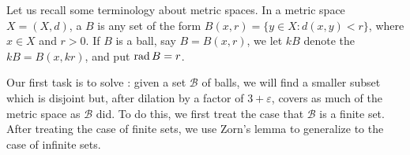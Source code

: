 \begin{subsec}
Let us recall some terminology about metric spaces.
In a metric space $X = (X, d)$, a  $B$ is any set of the form $B(x, r) = \{y \in X: d(x, y) < r\}$, where $x \in X$ and $r > 0$.
If $B$ is a ball, say $B = B(x, r)$, we let $kB$ denote the  $kB = B(x, kr)$, and put $\operatorname{rad} B = r$.
\end{subsec}

\begin{subsec}
Our first task is to solve : given a set $\mathcal B$ of balls, we will find a smaller subset which is disjoint but, after dilation by a factor of $3 + \varepsilon$, covers as much of the metric space as $\mathcal B$ did.
To do this, we first treat the case that $\mathcal B$ is a finite set.
After treating the case of finite sets, we use Zorn's lemma to generalize to the case of infinite sets.
\end{subsec}

